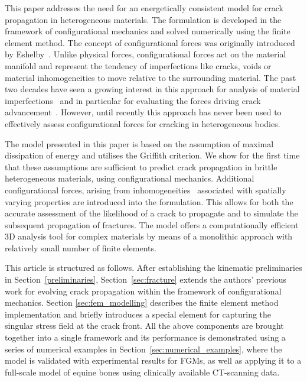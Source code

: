 \documentclass[onecolumn]{svjour3}
\begin{document}
This paper addresses the need for an energetically consistent model for crack propagation in heterogeneous materials.
The formulation is developed in the framework of configurational mechanics and solved numerically using the finite element method.
The concept of configurational forces was originally introduced by Eshelby~\cite{eshelby1951force}. 
Unlike physical forces, configurational forces act on the material manifold and represent the tendency of imperfections like cracks, 
voids or material inhomogeneities to move relative to the surrounding material. 
The past two decades have seen a growing interest in this approach for analysis of material imperfections~\cite{maugin2016configurational} and in particular for evaluating the forces driving crack advancement~\cite{kaczmarczyk2017energy,steinmann2001application, ozencc2016configurational}. 
However, until recently this approach has never been used to effectively assess configurational forces for cracking in heterogeneous bodies. 

The model presented in this paper is based on the assumption of maximal dissipation of energy and utilises the Griffith criterion. 
We show for the first time that these assumptions are sufficient to predict crack propagation in brittle heterogeneous materials, 
using configurational mechanics. 
Additional configurational forces, arising from inhomogeneities~\cite{kienzler2014configurational}
associated with spatially varying properties are introduced into the formulation. This allows for both the accurate assessment of the likelihood of a crack to propagate and to simulate the subsequent propagation of fractures. 
The model offers a computationally efficient 3D analysis tool for complex materials by means of a monolithic approach 
with relatively small number of finite elements. 

This article is structured as follows. After establishing the kinematic preliminaries in Section~\ref{preliminaries}, Section~\ref{sec:fracture} extends the authors' previous work for evolving crack propagation within the framework of configurational mechanics. Section \ref{sec:fem_modelling} describes the finite element method implementation and briefly introduces a special element for capturing the singular stress field at the crack front.  
All the above components are brought together into a single framework and its performance is demonstrated using a series of numerical examples in Section~\ref{sec:numerical_examples}, where the model is validated with experimental results for 
FGMs, as well as applying it to a full-scale model of equine bones using clinically available CT-scanning data.
\end{document}

